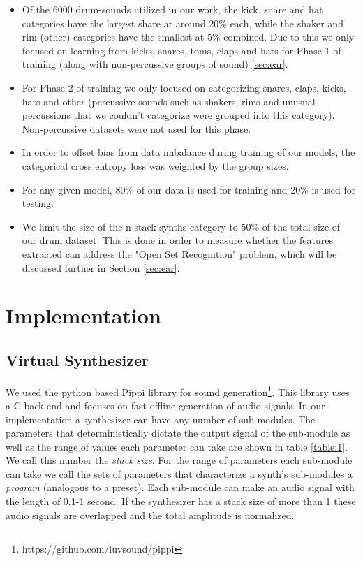 \documentclass{nime-alternate} %
\begin{document}
\begin{itemize}
\item Of the 6000 drum-sounds utilized in our work, the kick, snare and hat categories have the largest share at around 20\% each, while the shaker and rim (other) categories have the smallest at 5\% combined. Due to this we only focused on learning from kicks, snares, toms, claps and hats for Phase 1 of training (along with non-percussive groups of sound) \ref{sec:ear}.
\item For Phase 2 of training we only focused on categorizing snares, claps, kicks, hats and other (percussive sounds such as shakers, rims and unusual percussions that we couldn't categorize were grouped into this category). Non-percussive datasets were not used for this phase. 
\item In order to offset bias from data imbalance during training of our models, the categorical cross entropy loss was weighted by the group sizes. 
\item For any given model, 80\% of our data is used for training and 20\% is used for testing. 

\item We limit the size of the n-stack-synths category to 50\% of the total size of our drum dataset. This is done in order to measure whether the features extracted can address the "Open Set Recognition" problem, which will be discussed further in Section \ref{sec:ear}.
\end{itemize}
\section{Implementation}
\label{impl}

\subsection{Virtual Synthesizer}
\label{vs}
We used the python based Pippi library for sound generation\footnote{https://github.com/luvsound/pippi}. This library uses a C back-end and focuses on fast offline generation of audio signals. In our implementation a synthesizer can have any number of sub-modules. The parameters that deterministically dictate the output signal of the sub-module as well as the range of values each parameter can take are shown in table \ref{table:1}. We call this number the \textit{stack size}. For the range of parameters each sub-module can take we call the sets of parameters that characterize a synth's sub-modules a \textit{program} (analogous to a preset).  Each sub-module can make an audio signal with the length of 
0.1-1 second. If the synthesizer has a stack size of more than 1 these audio signals are overlapped and the total amplitude is normalized.
\end{document}
